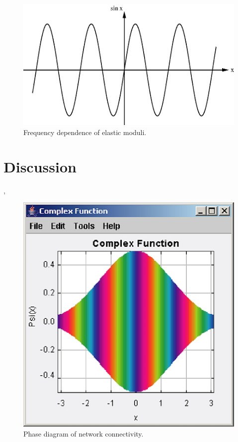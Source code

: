 \documentclass[prb,11pt]{revtex4-1}
\begin{document}
\begin{figure}[h!]
\centering
\includegraphics[scale=0.6]{sine}
\caption{\label{fig:freq}Frequency dependence of elastic moduli.}
\end{figure}




\section{Discussion}

{\color{blue}{Finally I wax philosophical}},
{\color{green}{but}} {\color{cyan}{who is going to pay for the ink?}}

\begin{figure}[h!]
\centering
\includegraphics[scale=0.6]{phase}
\caption{\label{fig:sim}Phase diagram of network connectivity.}
\end{figure}
\end{document}
